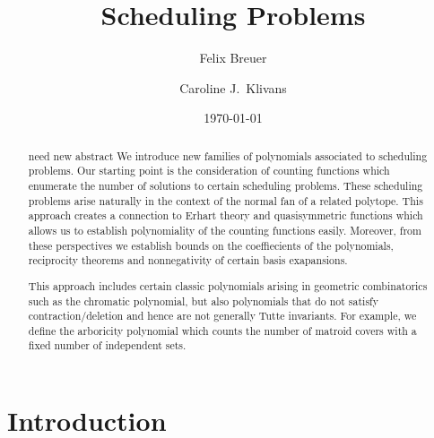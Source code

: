 \documentclass[12pt,reqno]{amsart}
\numberwithin{definition}{section}
\theoremstyle{definition}
\newcommand{\comment}[1]{\textsf{\footnotesize #1}}
\begin{document}
\title{Scheduling Problems}
\author{Felix Breuer}
\address{Research Institue for Symbolic Computation \\ Johannes Kepler University Linz}
\author{Caroline J.\ Klivans}
\address{Departments of Applied Mathematics and Computer Science \\Brown University}
\date{\today}



\begin{abstract}{\comment{need new abstract} We introduce new families of polynomials associated to scheduling problems.  Our starting point is the consideration of counting functions which enumerate the number of solutions to certain scheduling problems.  These scheduling problems arise naturally in the context of the normal fan of a related polytope.  This approach creates a connection to Erhart theory and quasisymmetric functions which allows us to establish polynomiality of the counting functions easily. Moreover, from these perspectives we establish bounds on the coeffiecients of the polynomials, reciprocity theorems and nonnegativity of certain basis exapansions. 

This approach includes certain classic polynomials arising in geometric combinatorics such as the chromatic polynomial, but also polynomials that do not satisfy contraction/deletion and hence are not generally Tutte invariants.  For example, we define the arboricity polynomial which counts the number of matroid covers with a fixed number of independent sets.}
\end{abstract}
\maketitle



\section{Introduction}
\end{document}
